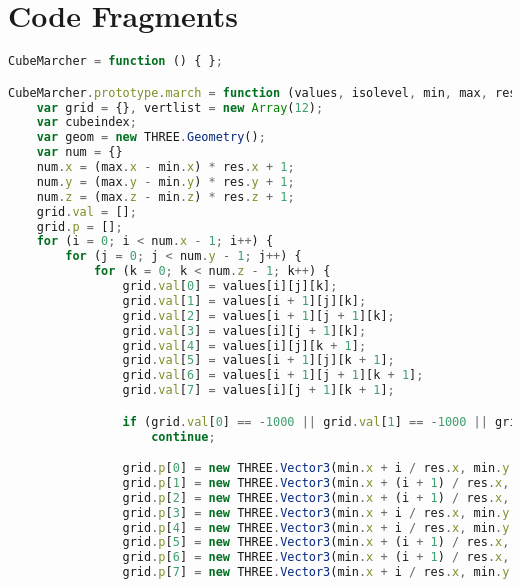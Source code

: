 \chapter{Code Fragments}

\lstset{
caption=Marching Cubes Algorithm,
label=list:Cubes}
\begin{lstlisting}[language=JavaScript]
CubeMarcher = function () { };

CubeMarcher.prototype.march = function (values, isolevel, min, max, res) {
    var grid = {}, vertlist = new Array(12);
    var cubeindex;
    var geom = new THREE.Geometry();
    var num = {}
    num.x = (max.x - min.x) * res.x + 1;
    num.y = (max.y - min.y) * res.y + 1;
    num.z = (max.z - min.z) * res.z + 1;
    grid.val = [];
    grid.p = [];
    for (i = 0; i < num.x - 1; i++) {
        for (j = 0; j < num.y - 1; j++) {
            for (k = 0; k < num.z - 1; k++) {
                grid.val[0] = values[i][j][k];
                grid.val[1] = values[i + 1][j][k];
                grid.val[2] = values[i + 1][j + 1][k];
                grid.val[3] = values[i][j + 1][k];
                grid.val[4] = values[i][j][k + 1];
                grid.val[5] = values[i + 1][j][k + 1];
                grid.val[6] = values[i + 1][j + 1][k + 1];
                grid.val[7] = values[i][j + 1][k + 1];

                if (grid.val[0] == -1000 || grid.val[1] == -1000 || grid.val[2] == -1000 || grid.val[3] == -1000 || grid.val[4] == -1000 || grid.val[5] == -1000 || grid.val[6] == -1000 || grid.val[7] == -1000)
                    continue;

                grid.p[0] = new THREE.Vector3(min.x + i / res.x, min.y + j / res.y, min.z + k / res.z);
                grid.p[1] = new THREE.Vector3(min.x + (i + 1) / res.x, min.y + j / res.y, min.z + k / res.z);
                grid.p[2] = new THREE.Vector3(min.x + (i + 1) / res.x, min.y + (j + 1) / res.y, min.z + k / res.z);
                grid.p[3] = new THREE.Vector3(min.x + i / res.x, min.y + (j + 1) / res.y, min.z + k / res.z);
                grid.p[4] = new THREE.Vector3(min.x + i / res.x, min.y + j / res.y, min.z + (k + 1) / res.z);
                grid.p[5] = new THREE.Vector3(min.x + (i + 1) / res.x, min.y + j / res.y, min.z + (k + 1) / res.z);
                grid.p[6] = new THREE.Vector3(min.x + (i + 1) / res.x, min.y + (j + 1) / res.y, min.z + (k + 1) / res.z);
                grid.p[7] = new THREE.Vector3(min.x + i / res.x, min.y + (j + 1) / res.y, min.z + (k + 1) / res.z);


\end{lstlisting}
